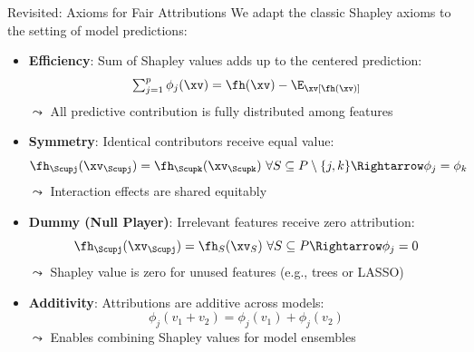 \documentclass[11pt,compress,t,notes=noshow, aspectratio=169, xcolor=table]{beamer}
\begin{document}
\begin{frame}{Revisited: Axioms for Fair Attributions}
We adapt the classic Shapley axioms to the setting of model predictions:
\vspace{0.25cm}

\begin{itemize}%
\item \textbf{Efficiency}: Sum of Shapley values adds up to the centered prediction:
\[
\textstyle\sum_{j=1}^p \phi_j(\xv) = \fh(\xv) - \E_\xv[\fh(\xv)]
\]
$\leadsto$ All predictive contribution is fully distributed among features

\item \textbf{Symmetry}: Identical contributors receive equal value:
\[
\fh_{\Scupj}(\xv_{\Scupj}) = \fh_{\Scupk}(\xv_{\Scupk}) \ \forall S \subseteq P \setminus \{j,k\}
\Rightarrow \phi_j = \phi_k
\]
$\leadsto$ Interaction effects are shared equitably

\item \textbf{Dummy (Null Player)}: Irrelevant features receive zero attribution:
\[
\fh_{\Scupj}(\xv_{\Scupj}) = \fh_S(\xv_S) \ \forall S \subseteq P \Rightarrow \phi_j = 0
\]
$\leadsto$ Shapley value is zero for unused features (e.g., trees or LASSO)

\item \textbf{Additivity}: Attributions are additive across models:
\[
\phi_j(v_1 + v_2) = \phi_j(v_1) + \phi_j(v_2)
\]
$\leadsto$ Enables combining Shapley values for model ensembles

\end{itemize}
\end{frame}



\end{document}
